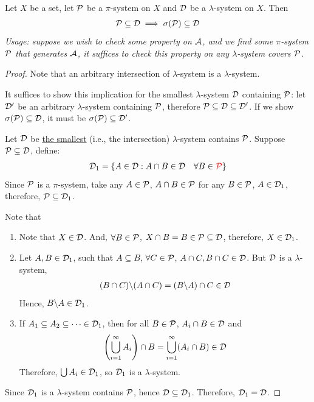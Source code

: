 \documentclass[11pt]{article}
\begin{document}
	\begin{theorem}
		Let $X$ be a set, let $\mathcal{{P}}$ be a $\pi$-system on $X$ and $\mathcal{{D}}$ be a $\lambda$-system on $X$. Then
		\begin{align}
			\mathcal{{P}} \subseteq \mathcal{{D}} \implies \sigma(\mathcal{{P}}) \subseteq \mathcal{{D}}
		\end{align}
		\emph{Usage: suppose we wish to check some property on $\mathcal{{A}}$, and we find some $\pi$-system $\mathcal{{P}}$ that generates $\mathcal{{A}}$, it suffices to check this property on any $\lambda$-system covers $\mathcal{{P}}$.}
		\begin{proof}
			Note that an arbitrary intersection of $\lambda$-system is a $\lambda$-system.

			It suffices to show this implication for the smallest $\lambda$-system $\mathcal{{D}}$ containing $\mathcal{{P}}$: let $\mathcal{{D}}'$ be an arbitrary $\lambda$-system containing $\mathcal{{P}}$, therefore $\mathcal{{P}} \subseteq \mathcal{{D}} \subseteq \mathcal{{D}}'$.
			If we show $\sigma(\mathcal{{P}}) \subseteq \mathcal{{D}}$, it must be $\sigma(\mathcal{{P}}) \subseteq \mathcal{{D}}'$.

			Let $\mathcal{{D}}$ be \ul{the smallest} (i.e., the intersection) $\lambda$-system contains $\mathcal{{P}}$.
			Suppose $\mathcal{{P}} \subseteq \mathcal{{D}}$,
			define:
			\begin{align}
				\mathcal{{D}}_1 = \{A \in \mathcal{{D}} : A \cap B \in \mathcal{{D}}\quad \forall B \in \textcolor{red}{\mathcal{{P}}}\}
			\end{align}
			Since $\mathcal{{P}}$ is a $\pi$-system, take any $A \in \mathcal{{P}}$, $A \cap B \in \mathcal{{P}}$ for any $B \in \mathcal{{P}}$, $A \in \mathcal{{D}}_1$, therefore, $\mathcal{{P}} \subseteq \mathcal{{D}}_1$.
			
			Note that
			\begin{enumerate}
				\item Note that $X \in \mathcal{{D}}$. And, $\forall B \in \mathcal{{P}}$, $X \cap B = B \in \mathcal{{P}} \subseteq \mathcal{{D}}$, therefore, $X \in \mathcal{{D}}_1$.
				\item Let $A, B \in \mathcal{{D}}_1$, such that $A \subseteq B$, $\forall C \in \mathcal{{P}}$, $A \cap C, B \cap C \in \mathcal{{D}}$.
				But $\mathcal{{D}}$ is a $\lambda$-system, 
				\begin{align}
					(B \cap C) \backslash (A \cap C) = (B \backslash A) \cap C \in \mathcal{{D}}
				\end{align}
				Hence, $B \backslash A \in \mathcal{{D}}_1$.
				\item If $A_1 \subseteq A_2 \subseteq \dots \in \mathcal{{D}}_1$, then for all $B \in \mathcal{{P}}$, $A_i \cap B \in \mathcal{{D}}$ and
				\begin{align}
					\left(\bigcup_{i=1}^\infty A_i\right) \cap B = \bigcup_{i=1}^\infty (A_i \cap B) \in \mathcal{{D}} \label{eq:5}
				\end{align}
				Therefore, $\bigcup A_i \in \mathcal{{D}}_1$, so $\mathcal{{D}}_1$ is a $\lambda$-system.
			\end{enumerate}
			Since $\mathcal{{D}}_1$ is a $\lambda$-system contains $\mathcal{{P}}$, hence $\mathcal{{D}} \subseteq \mathcal{{D}}_1$. Therefore, $\mathcal{{D}}_1 = \mathcal{{D}}$.
			

\end{proof}
\end{theorem}
\end{document}
